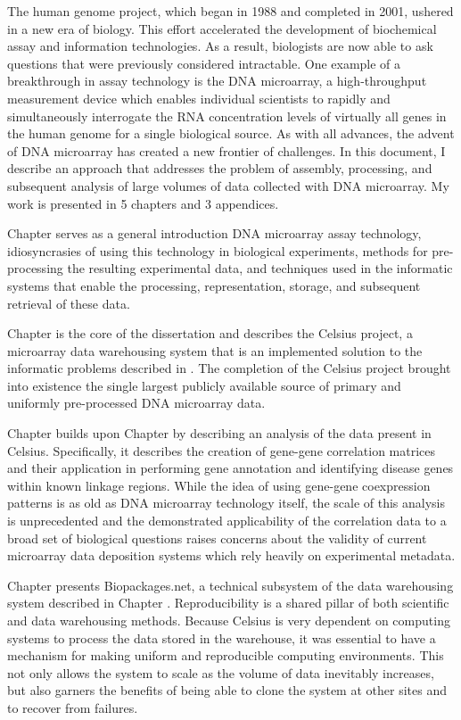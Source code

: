 The human genome project, which began in 1988 and completed in 2001, ushered in
a new era of biology.  This effort accelerated the development of biochemical
assay and information technologies.  As a result, biologists are now able to
ask questions that were previously considered intractable.  One example of a
breakthrough in assay technology is the DNA microarray, a high-throughput
measurement device which enables individual scientists to rapidly and
simultaneously interrogate the RNA concentration levels of virtually all genes
in the human genome for a single biological source.  As with all advances, the
advent of DNA microarray has created a new frontier of challenges.  In this
document, I describe an approach that addresses the problem of assembly,
processing, and subsequent analysis of large volumes of data collected with DNA
microarray.  My work is presented in 5 chapters and 3 appendices.

Chapter \introchapter serves as a general introduction DNA microarray assay
technology, idiosyncrasies of using this technology in biological experiments,
methods for pre-processing the resulting experimental data, and techniques used
in the informatic systems that enable the processing, representation, storage,
and subsequent retrieval of these data.

Chapter \celsiuschapter is the core of the dissertation and describes the
Celsius project, a microarray data warehousing system that is an implemented
solution to the informatic problems described in \introchapter.  The completion
of the Celsius project brought into existence the single largest publicly
available source of primary and uniformly pre-processed DNA microarray data.

Chapter \corchapter builds upon Chapter \celsiuschapter by describing an
analysis of the data present in Celsius.  Specifically, it describes the
creation of gene-gene correlation matrices and their application in performing
gene annotation and identifying disease genes within known linkage regions.
While the idea of using gene-gene coexpression patterns is as old as DNA
microarray technology itself, the scale of this analysis is unprecedented and
the demonstrated applicability of the correlation data to a broad set of
biological questions raises concerns about the validity of current microarray
data deposition systems which rely heavily on experimental metadata.

Chapter \biopackageschapter presents Biopackages.net, a technical subsystem of
the data warehousing system described in Chapter \celsiuschapter.
Reproducibility is a shared pillar of both scientific and data warehousing
methods.  Because Celsius is very dependent on computing systems to process the
data stored in the warehouse, it was essential to have a mechanism for making
uniform and reproducible computing environments.  This not only allows the
system to scale as the volume of data inevitably increases, but also garners
the benefits of being able to clone the system at other sites and to recover
from failures.

